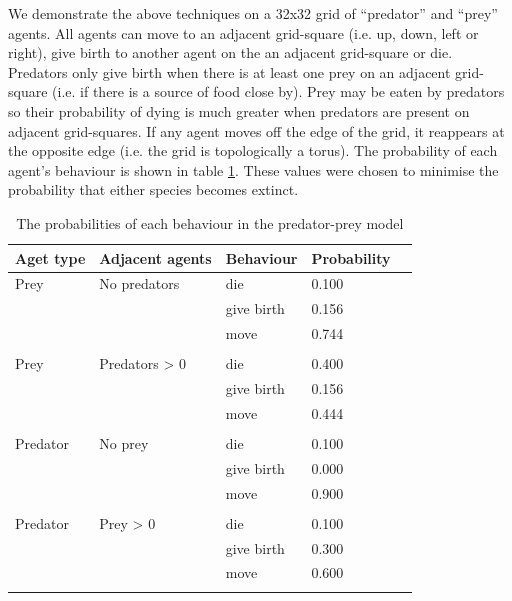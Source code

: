 \documentclass{article}
\begin{document}
We demonstrate the above techniques on a 32x32 grid of ``predator'' and ``prey'' agents. All agents can move to an adjacent grid-square (i.e. up, down, left or right), give birth to another agent on the an adjacent grid-square or die. Predators only give birth when there is at least one prey on an adjacent grid-square (i.e. if there is a source of food close by). Prey may be eaten by predators so their probability of dying is much greater when predators are present on adjacent grid-squares. If any agent moves off the edge of the grid, it reappears at the opposite edge (i.e. the grid is topologically a torus). The probability of each agent's behaviour is shown in table \ref{rates}. These values were chosen to minimise the probability that either species becomes extinct.
\begin{table}
	\begin{center}
		\begin{tabular}{llllc}
		\hline
		Aget type & Adjacent agents & Behaviour & Probability\\
		\hline
		Prey & No predators & die &        0.100\\
			& & give birth &        0.156\\
			& & move &        0.744\\
			& &&\\
		Prey & Predators > 0 & die &        0.400\\
			& & give birth &        0.156\\
			& & move &        0.444\\
			& &&\\
		Predator  & No prey & die  &      0.100\\
			& & give birth &        0.000\\
			& & move &        0.900\\
			& &&\\
		Predator  & Prey > 0 & die  &      0.100\\
			& & give birth &        0.300\\
			& & move &        0.600\\
		\hline& 
		\end{tabular}
	\end{center}
	\caption{The probabilities of each behaviour in the predator-prey model}
	\label{rates}
\end{table}
\end{document}
